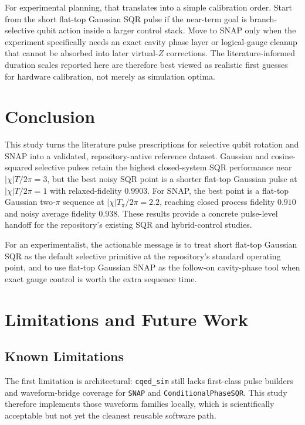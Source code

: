 \documentclass[aps,pra,twocolumn,reprint,amsmath,amssymb]{revtex4-2}
\begin{document}
For experimental planning, that translates into a simple calibration order. Start from the short flat-top Gaussian SQR pulse if the near-term goal is branch-selective qubit action inside a larger control stack. Move to SNAP only when the experiment specifically needs an exact cavity phase layer or logical-gauge cleanup that cannot be absorbed into later virtual-$Z$ corrections. The literature-informed duration scales reported here are therefore best viewed as realistic first guesses for hardware calibration, not merely as simulation optima.

\section{Conclusion}

This study turns the literature pulse prescriptions for selective qubit rotation and SNAP into a validated, repository-native reference dataset. Gaussian and cosine-squared selective pulses retain the highest closed-system SQR performance near $|\chi|T/2\pi=3$, but the best noisy SQR point is a shorter flat-top Gaussian pulse at $|\chi|T/2\pi=1$ with relaxed-fidelity $0.9903$. For SNAP, the best point is a flat-top Gaussian two-$\pi$ sequence at $|\chi|T_\pi/2\pi=2.2$, reaching closed process fidelity $0.910$ and noisy average fidelity $0.938$. These results provide a concrete pulse-level handoff for the repository's existing SQR and hybrid-control studies.

For an experimentalist, the actionable message is to treat short flat-top Gaussian SQR as the default selective primitive at the repository's standard operating point, and to use flat-top Gaussian SNAP as the follow-on cavity-phase tool when exact gauge control is worth the extra sequence time.

\section{Limitations and Future Work}

\subsection{Known Limitations}

The first limitation is architectural: \texttt{cqed\_sim} still lacks first-class pulse builders and waveform-bridge coverage for \texttt{SNAP} and \texttt{ConditionalPhaseSQR}. This study therefore implements those waveform families locally, which is scientifically acceptable but not yet the cleanest reusable software path.
\end{document}
